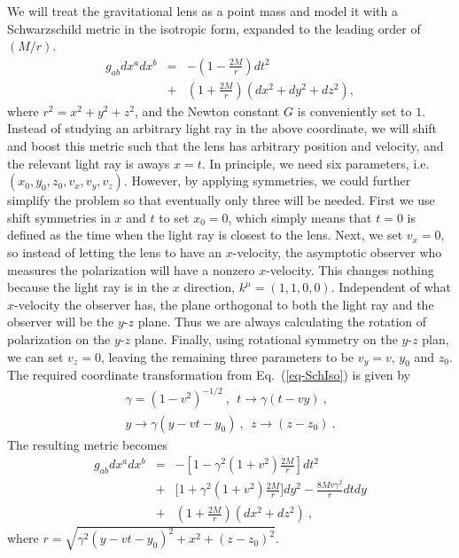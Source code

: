\documentclass[aps,showpacs,twocolumn,floats,prd,superscriptaddress,nofootinbib]{revtex4}
\begin{document}
We will treat the gravitational lens as a point mass and model it with a Schwarzschild metric in the isotropic form, expanded to the leading order of $(M/r)$. 
\begin{eqnarray}
g_{ab}dx^adx^b &=& -\left(1-\frac{2M}{r}\right)dt^2 \\ \nonumber
&+& \left(1+\frac{2M}{r}\right)  \left(dx^2+dy^2+dz^2\right), 
\label{eq-SchIso}
\end{eqnarray}
where  $r^2 = x^2 + y^2 + z^2$,  and the Newton constant $G$ is conveniently set to $1$.
Instead of studying an arbitrary light ray in the above coordinate, we will shift and boost this metric such that the lens has arbitrary position and velocity, and the relevant light ray is aways $x=t$.
In principle, we need six parameters, i.e. $(x_0,y_0,z_0,v_x,v_y,v_z)$. However, 
by applying symmetries, we could further simplify the problem so that eventually only three will be needed. 
First we use shift symmetries in $x$ and $t$ to set $x_0=0$, which simply means that $t=0$ is defined as the time when the light ray is closest to the lens. Next, we set $v_x=0$, so instead of letting the lens to have an $x$-velocity, the asymptotic observer who measures the polarization will have a nonzero $x$-velocity. 
This changes nothing because the light ray is in the $x$ direction, $k^\mu = (1,1,0,0)$.
Independent of what $x$-velocity the observer has, the plane orthogonal to both the light ray and the observer will be the $y$-$z$ plane.
Thus we are always calculating the rotation of polarization on the $y$-$z$ plane.
Finally, using rotational symmetry on the $y$-$z$ plan, we can set $v_z=0$, leaving the remaining three parameters to be $v_y=v$, $y_0$ and $z_0$. The required coordinate transformation from Eq.~(\ref{eq-SchIso}) is given by
\begin{eqnarray}
\gamma = (1-v^2)^{-1/2}~, \ \ t \rightarrow \gamma(t-vy)~, \nonumber \\
 y\rightarrow \gamma(y-vt-y_0)~, \ \ z\rightarrow (z-z_0)~.
\end{eqnarray}
The resulting metric becomes
\begin{eqnarray}
\label{eq-metric}
g_{ab}dx^adx^b &=& -\left[1-\gamma^2(1+v^2)\frac{2M}{r}\right]dt^2   
\nonumber \\
&+& \biggl [1  +  \gamma^2(1+v^2)\frac{2M}{r} \biggr]dy^2 
- \frac{8Mv\gamma^2}{r}dtdy  \nonumber \\
&+& \left(1+\frac{2M}{r}\right)(dx^2+dz^2)~,
\end{eqnarray}
where $r = \sqrt{ \gamma^2(y-vt-y_0)^2 + x^2 + (z-z_0)^2 }$. 
\end{document}
